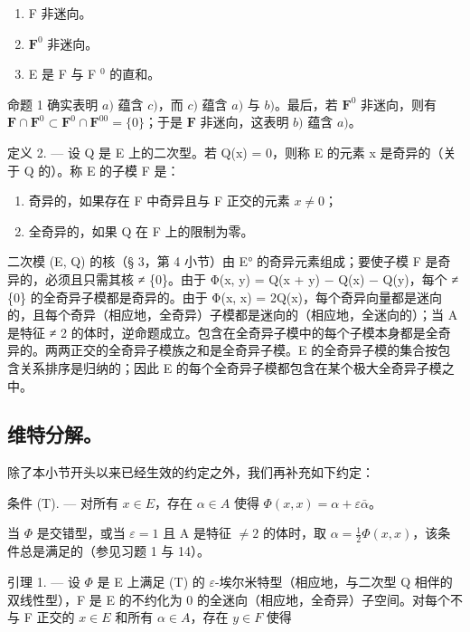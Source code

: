 \begin{enumerate}
\def\labelenumi{\alph{enumi})}
\item
  F 非迷向。
\item
  \(\mathbf{F}^0\) 非迷向。
\item
  E 是 F 与 F \(^{0}\) 的直和。
\end{enumerate}

命题 1 确实表明 \(a)\) 蕴含 \(c)\)，而 \(c)\) 蕴含 \(a)\) 与 \(b)\)。最后，若 \(\mathbf{F}^0\) 非迷向，则有 \(\mathbf{F} \cap \mathbf{F}^0 \subset \mathbf{F}^0 \cap \mathbf{F}^{00} = \{0\}\)；于是 \(\mathbf{F}\) 非迷向，这表明 \(b)\) 蕴含 \(a)\)。

定义 2. --- 设 Q 是 E 上的二次型。若 Q(x) = 0，则称 E 的元素 x 是奇异的（关于 Q 的）。称 E 的子模 F 是：

\begin{enumerate}
\def\labelenumi{\arabic{enumi})}
\item
  奇异的，如果存在 F 中奇异且与 F 正交的元素 \(x \neq 0\)；
\item
  全奇异的，如果 Q 在 F 上的限制为零。
\end{enumerate}

二次模 (E, Q) 的核（§ 3，第 4 小节）由 E° 的奇异元素组成；要使子模 F 是奇异的，必须且只需其核 ≠ \{0\}。由于 Φ(x, y) = Q(x + y) − Q(x) − Q(y)，每个 ≠ \{0\} 的全奇异子模都是奇异的。由于 Φ(x, x) = 2Q(x)，每个奇异向量都是迷向的，且每个奇异（相应地，全奇异）子模都是迷向的（相应地，全迷向的）；当 A 是特征 ≠ 2 的体时，逆命题成立。包含在全奇异子模中的每个子模本身都是全奇异的。两两正交的全奇异子模族之和是全奇异子模。E 的全奇异子模的集合按包含关系排序是归纳的；因此 E 的每个全奇异子模都包含在某个极大全奇异子模之中。

\subsection{维特分解。}

除了本小节开头以来已经生效的约定之外，我们再补充如下约定：

条件 (T). --- 对所有 \(x \in E\)，存在 \(\alpha \in A\) 使得 \(\Phi(x, x) = \alpha + \varepsilon\bar{\alpha}\)。

当 \(\Phi\) 是交错型，或当 \(\varepsilon = 1\) 且 A 是特征 \(\neq 2\) 的体时，取 \(\alpha = \frac{1}{2}\Phi(x, x)\)，该条件总是满足的（参见习题 1 与 14）。

引理 1. --- 设 \(\Phi\) 是 E 上满足 (T) 的 \(\varepsilon\)-埃尔米特型（相应地，与二次型 Q 相伴的双线性型），F 是 E 的不约化为 0 的全迷向（相应地，全奇异）子空间。对每个不与 F 正交的 \(x \in E\) 和所有 \(\alpha \in A\)，存在 \(y \in F\) 使得


